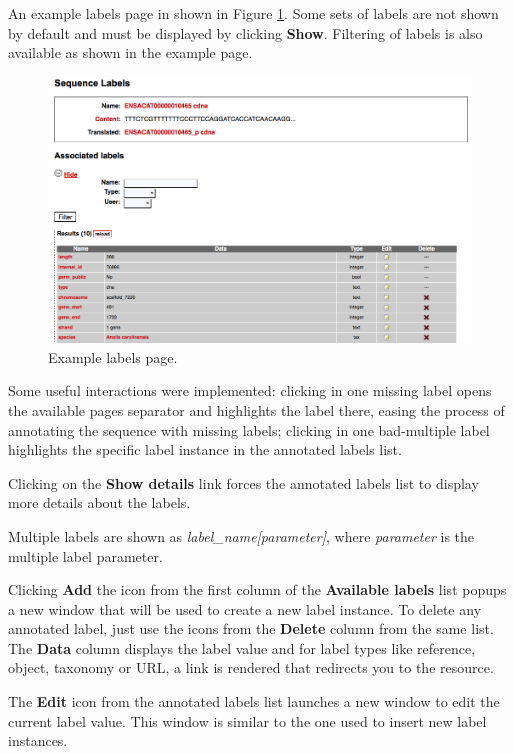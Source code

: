 An example labels page in shown in Figure \ref{fig:labels2}. Some sets of labels are not shown
by default and must be displayed by clicking \textbf{Show}. Filtering of labels is also available
as shown in the example page.

\begin{figure}[ht]
  \centering
    \includegraphics[scale=0.5]{labels.png}
  \caption{Example labels page.}
  \label{fig:labels2}
\end{figure}

Some useful interactions were implemented: clicking in one missing label opens the available pages
separator and highlights the label there, easing the process of annotating the sequence with missing
labels; clicking in one bad-multiple label highlights the specific label instance in the annotated labels list.

Clicking on the \textbf{Show details} link forces the annotated labels list to display more details
about the labels.

Multiple labels are shown as \textit{label\_name[parameter]}, where \textit{parameter} is the multiple
label parameter.

Clicking \textbf{Add} the icon from the first column of the \textbf{Available labels} list popups a new window
that will be used to create a new label instance. To delete any annotated label,
just use the icons from the \textbf{Delete} column
from the same list. The \textbf{Data} column displays the label value and for label types like
reference, object, taxonomy or URL, a link is rendered that redirects you to the resource.

The \textbf{Edit} icon from the annotated labels list
launches a new window to edit the current label value.
This window is similar to the one used to insert new label instances.

